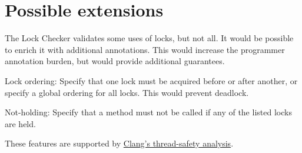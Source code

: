 \section{Possible extensions\label{lock-extensions}}

The Lock Checker validates some uses of locks, but not all.  It would be
possible to enrich it with additional annotations.  This would increase the
programmer annotation burden, but would provide additional guarantees.

Lock ordering:  Specify that one lock must be acquired before or after
another, or specify a global ordering for all locks.  This would prevent
deadlock.

Not-holding:  Specify that a method must not be called if any of the listed
locks are held.

These features are supported by
\href{http://clang.llvm.org/docs/ThreadSafetyAnalysis.html}{Clang's
  thread-safety analysis}.


